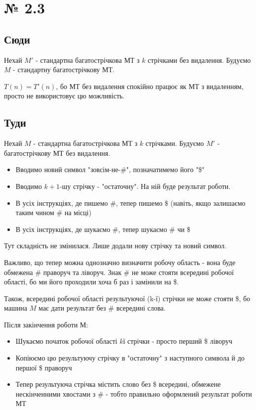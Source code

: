 \documentclass[11pt, a4paper]{article} %
\begin{document}
\section*{№ 2.3}
\subsection*{Сюди}
Нехай $M'$ - стандартна багатострічкова МТ з $k$ стрічками без видалення.
Будуємо $M$ - стандартну багатострічкову МТ.

$T(n) = T'(n)$, бо МТ без видалення спокійно працює як МТ з видаленням, просто не використовує цю можливість.

\subsection*{Туди}
Нехай $M$ - стандартна багатострічкова МТ з $k$ стрічками.
Будуємо $M'$ - багатострічкову МТ без видалення.

\begin{itemize}
    \item Вводимо новий символ "зовсім-не-\#", позначатимемо його "\$"
    \item Вводимо $k+1$-шу стрічку - "остаточну". На ній буде результат роботи. 
    \item В усіх інструкціях, де пишемо \#, тепер пишемо \$ (навіть, якщо залишаємо таким чином \# на місці) 
    \item В усіх інструкціях, де шукаємо \#, тепер шукаємо \# чи \$
\end{itemize}

Тут складність не змінилася. Лише додали нову стрічку та новий символ.

Важливо, що тепер можна однозначно визначити робочу область - вона буде обмежена \# праворуч та ліворуч. 
Знак \# не може стояти всередині робочої області, бо ми його проходили хоча б раз і замінили на \$. 

Також, всередині робочої області результуючої (k-ї) стрічки не може стояти \$, 
бо машина $M$ має дати результат без \# всередині слова.

Після закінчення роботи М:
\begin{itemize}
    \item Шукаємо початок робочої області $k$ї стрічки - просто перший \$ ліворуч
    \item Копіюємо цю результуючу стрічку в "остаточну" з наступного символа й до першої \$ праворуч
    \item Тепер результуюча стрічка містить слово без \$ всередині, обмежене нескінченними хвостами з \# - тобто правильно оформлений результат роботи МТ
\end{itemize}
\end{document}
